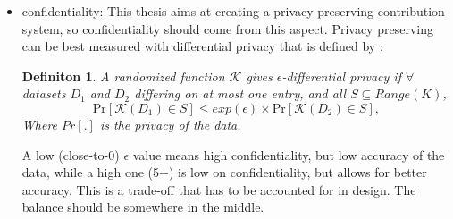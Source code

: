 \documentclass[a4paper,11pt]{report} %
\theoremstyle{change}
\theoremstyle{theoremstyle}
\newtheorem{defi}[theorem]{Definiton}
{\theorembodyfont{\rmfamily}
\newtheorem{note}[theorem]{Note}
\newtheorem{conseq}[theorem]{Consequence}
\newtheorem{eg}[theorem]{Example}
}%
\begin{document}
\begin{itemize}
\begin{equation*}
    \end{equation*}
    \item confidentiality: This thesis aims at creating a privacy preserving contribution system, so  confidentiality should come from this aspect. 
    Privacy preserving can be best measured with differential privacy that is defined by \cite{bugliesi2006automata}: %
    \begin{defi}
        A randomized function $\mathcal{K}$ gives $\epsilon$-differential privacy if $\forall$ datasets $D_1$ and $D_2$ differing on at most one entry, and all $S \subseteq \textit{Range}(K)$,
        \begin{equation*}
        \text{Pr}[\mathcal{K}(D_1) \in S] \leq exp(\epsilon) \times \text{Pr}[\mathcal{K}(D_2) \in S],
    \end{equation*}
    Where $Pr[.]$ is the privacy of the data.
    \end{defi}
    A low (close-to-0) $\epsilon$ value means high confidentiality, but low accuracy of the data, while a high one (5+) is low on confidentiality, but allows for better accuracy. This is a trade-off that has to be accounted for in design. The balance should be somewhere in the middle.
    

\end{itemize}
\end{document}
